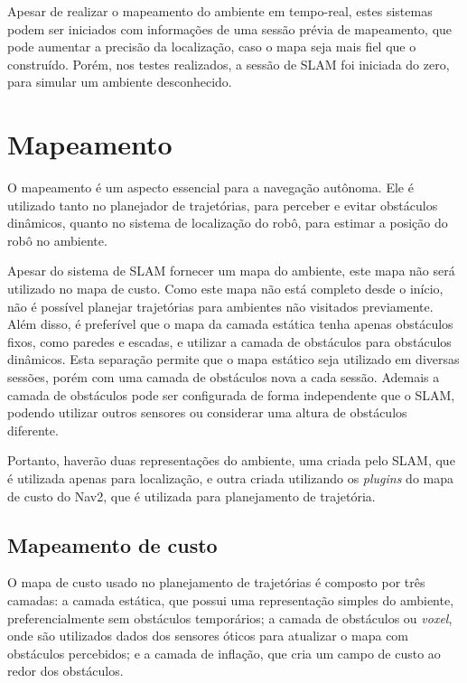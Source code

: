 \documentclass[repeatfields,xlists,xpacks,oneside,yearsonly]{ufrgscca}
\begin{document}
Apesar de realizar o mapeamento do ambiente em tempo-real, estes
sistemas podem ser iniciados com informações de uma sessão prévia de
mapeamento, que pode aumentar a precisão da localização, caso o mapa
seja mais fiel que o construído. Porém, nos testes realizados, a
sessão de SLAM foi iniciada do zero, para simular um ambiente
desconhecido.

\section{Mapeamento}

O mapeamento é um aspecto essencial para a navegação autônoma. Ele é
utilizado tanto no planejador de trajetórias, para perceber e evitar
obstáculos dinâmicos, quanto no sistema de localização do robô, para
estimar a posição do robô no ambiente.

Apesar do sistema de SLAM fornecer um mapa do ambiente, este mapa não
será utilizado no mapa de custo. Como este mapa não está completo
desde o início, não é possível planejar trajetórias para ambientes
não visitados previamente. Além disso, é preferível que o mapa da
camada estática tenha apenas obstáculos fixos, como paredes e
escadas, e utilizar a camada de obstáculos para obstáculos dinâmicos.
Esta separação permite que o mapa estático seja utilizado em diversas
sessões, porém com uma camada de obstáculos nova a cada sessão.
Ademais a camada de obstáculos pode ser configurada de forma
independente que o SLAM, podendo utilizar outros sensores ou
considerar uma altura de obstáculos diferente.

Portanto, haverão duas representações do ambiente, uma criada pelo
SLAM, que é utilizada apenas para localização, e outra criada
utilizando os \textit{plugins} do mapa de custo do Nav2, que é
utilizada para planejamento de trajetória.

\subsection{Mapeamento de custo}

O mapa de custo usado no planejamento de trajetórias é composto por
três camadas: a camada estática, que possui uma representação simples
do ambiente, preferencialmente sem obstáculos temporários; a camada
de obstáculos ou \textit{voxel}, onde são utilizados dados dos
sensores óticos para atualizar o mapa com obstáculos percebidos; e a
camada de inflação, que cria um campo de custo ao redor dos
obstáculos.
\end{document}
